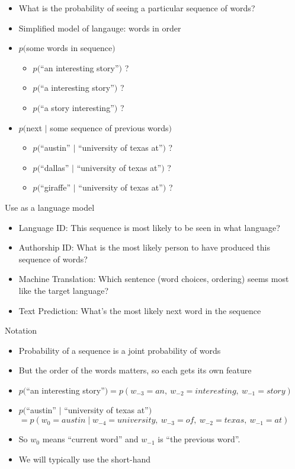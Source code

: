 \documentclass[11pt,letterpaper]{article}
\begin{document}
\begin{itemize}
  \item What is the probability of seeing a particular sequence of words?
  \item Simplified model of langauge: words in order
  \item $p($some words in sequence$)$
    \begin{itemize}
      \item $p($``an interesting story''$)$ ?
      \item $p($``a interesting story''$)$ ?
      \item $p($``a story interesting''$)$ ?
    \end{itemize}
  \item $p($next $\mid$ some sequence of previous words$)$
    \begin{itemize}
      \item $p($``austin'' $\mid$ ``university of texas at''$)$ ?
      \item $p($``dallas'' $\mid$ ``university of texas at''$)$ ?
      \item $p($``giraffe'' $\mid$ ``university of texas at''$)$ ?
    \end{itemize}
\end{itemize}

Use as a language model

\begin{itemize}
  \item Language ID: This sequence is most likely to be seen in what language?
  \item Authorship ID: What is the most likely person to have produced this sequence of words?
  \item Machine Translation: Which sentence (word choices, ordering) seems most like the target language?
  \item Text Prediction: What's the most likely next word in the sequence
\end{itemize}

Notation

\begin{itemize}
  \item Probability of a sequence is a joint probability of words
  \item But the order of the words matters, so each gets its own feature
  \item $p($``an interesting story''$) = p(w_{-3}=an, ~ w_{-2}=interesting, ~ w_{-1}=story)$
  \item $p($``austin'' $\mid$ ``university of texas at''$)$\\
        $= p(w_{0}=austin \mid w_{-4}=university, ~ w_{-3}=of, ~ w_{-2}=texas, ~ w_{-1}=at)$
  \item So $w_0$ means ``current word'' and $w_{-1}$ is ``the previous word''.
  \item We will typically use the short-hand
\end{itemize}
\end{document}
